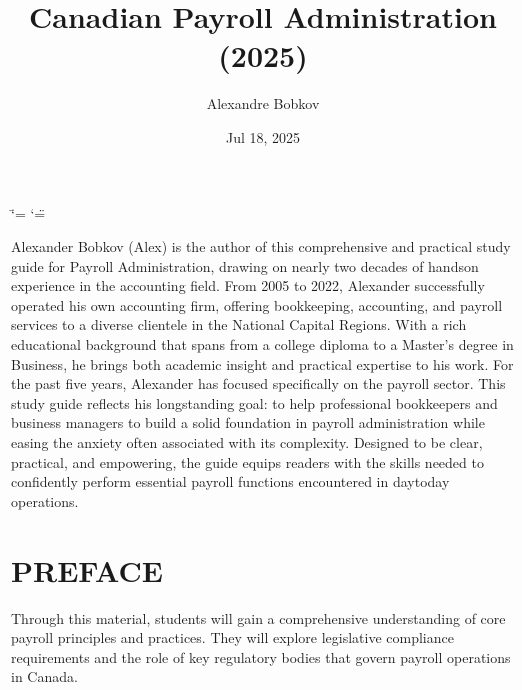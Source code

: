 \documentclass[letterpaper,10pt,english]{sphinxmanual}
\title{Canadian Payroll Administration (2025)}
\date{Jul 18, 2025}
\author{Alexandre Bobkov}
\begin{document}
\ifdefined\shorthandoff
  \ifnum\catcode`\=\string=\active\shorthandoff{=}\fi
  \ifnum\catcode`\"=\active{}\fi
\fi

\pagestyle{empty}
\sphinxmaketitle
\pagestyle{plain}
\sphinxtableofcontents
\pagestyle{normal}
\label{\detokenize{index::doc}}


\sphinxAtStartPar
Alexander Bobkov (Alex) is the author of this comprehensive and practical study guide for Payroll Administration,
drawing on nearly two decades of hands\sphinxhyphen{}on experience in the accounting field. From 2005 to 2022, Alexander successfully
operated his own accounting firm, offering bookkeeping, accounting, and payroll services to a diverse clientele in the National Capital Regions.
With a rich educational background that spans from a college diploma to a Master’s degree in Business, he brings both academic insight
and practical expertise to his work. For the past five years, Alexander has focused specifically on the payroll sector. This study guide reflects
his long\sphinxhyphen{}standing goal: to help professional bookkeepers and business managers to build a solid foundation in payroll administration while easing
the anxiety often associated with its complexity. Designed to be clear, practical, and empowering, the guide equips readers with the skills needed
to confidently perform essential payroll functions encountered in day\sphinxhyphen{}to\sphinxhyphen{}day operations.

\sphinxstepscope


\chapter{PREFACE}
\label{\detokenize{preface:preface}}\label{\detokenize{preface::doc}}
\sphinxAtStartPar
Through this material, students will gain a comprehensive understanding of core payroll principles and practices. They will explore legislative compliance requirements and the role of key regulatory bodies that govern payroll operations in Canada.
\end{document}
